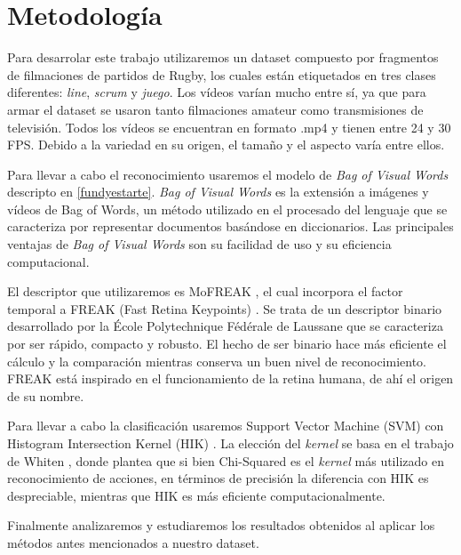 \section{Metodología}
\iffalse
Se recomienda estructurar esta sección en función de los objetivos específicos.
* Planteo de la hipotesis a analizar en cada objetivo o seccion del proyecto.
* Actividades propuestas y metodologıa a usar en cada una de ellas.
* Resultados que se esperan obtener o metas a cumplir y como se evaluaran
los resultados.
Trate de evaluar los potenciales problemas y limitaciones de la metodolog ́ıa
y t ́ecnicas propuestas y en lo posible proponer alternativas.
\fi

Para desarrolar este trabajo utilizaremos un dataset compuesto por fragmentos de filmaciones de partidos de Rugby, los cuales están etiquetados en
tres clases diferentes: \textit{line}, \textit{scrum} y \textit{juego}. Los vídeos varían mucho entre sí, ya que para armar el dataset se usaron
tanto filmaciones amateur como transmisiones de televisión. Todos los vídeos se encuentran en formato .mp4 y tienen entre 24 y 30 FPS. Debido a la
variedad en su origen, el tamaño y el aspecto varía entre ellos.

Para llevar a cabo el reconocimiento usaremos el modelo de \textit{Bag of Visual Words} descripto en \ref{fundyestarte}. \textit{Bag of Visual Words}
es la extensión a imágenes y vídeos de Bag of Words, un método utilizado en el procesado del lenguaje que se caracteriza por representar documentos
basándose en diccionarios. Las principales ventajas de \textit{Bag of Visual Words} son su facilidad de uso y su eficiencia computacional.

El descriptor que utilizaremos es MoFREAK \parencite{whiten2013mofreak}, el cual incorpora el factor temporal a FREAK (Fast Retina Keypoints) \parencite{alahi2012freak}.
Se trata de un descriptor binario desarrollado por la École Polytechnique Fédérale de Laussane que se caracteriza por ser rápido, compacto y robusto.
El hecho de ser binario hace más eficiente el cálculo y la comparación mientras conserva un buen nivel de reconocimiento. FREAK está inspirado
en el funcionamiento de la retina humana, de ahí el origen de su nombre.

Para llevar a cabo la clasificación usaremos Support Vector Machine (SVM) con Histogram Intersection Kernel (HIK) \parencite{barla2003histogram}. La
elección del \textit{kernel} se basa en el trabajo de Whiten \parencite{whiten2013mofreak}, donde plantea que si bien Chi-Squared es el \textit{kernel}
más utilizado en reconocimiento de acciones, en términos de precisión la diferencia con HIK es despreciable, mientras que HIK es más eficiente
computacionalmente.

Finalmente analizaremos y estudiaremos los resultados obtenidos al aplicar los métodos antes mencionados a nuestro dataset.
